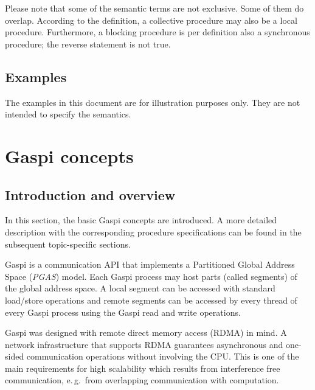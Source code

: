 \documentclass[a4paper]{article}
\newlength{\st}\setlength{\st}{0pt}
\newcommand{\GASPI}{{\sc Gaspi}}
\begin{document}
Please note that some of the semantic terms are not exclusive. Some of
them do overlap. According to the definition, a collective procedure
may also be a local procedure. Furthermore, a blocking procedure is
per definition also a synchronous procedure; the reverse statement is
not true.



\subsection{Examples}

The examples in this document are for illustration purposes only. They are not intended
to specify the semantics.


\section{\GASPI{} concepts}

\subsection{Introduction and overview}

In this section, the basic \GASPI{} concepts are introduced. A more detailed
description with the corresponding procedure specifications can be found
in the subsequent topic-specific sections.

\GASPI{} is a communication API that implements a Partitioned Global
Address Space (\emph{PGAS}) model. Each \GASPI{} process may host 
parts (called segments) of the global address space. A local segment 
can be accessed with standard load/store operations and remote segments
can be accessed by every thread of every \GASPI{} process using the
\GASPI{} read and write operations.

\GASPI{} was designed with remote direct memory access (RDMA) in mind.
A network infrastructure that supports RDMA guarantees asynchronous and
one-sided communication operations without involving the CPU. This is
one of the main requirements for high scalability which results from
interference free communication, e.\,g.\ from overlapping communication
with computation.
\end{document}
